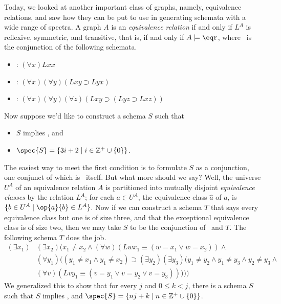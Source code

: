 Today, we looked at another important class of graphs, namely, equivalence relations, and saw how they can be put to use in generating schemata with a wide range of spectra. A graph $A$ is an \emph{equivalence relation} if and only if $L^A$ is reflexive, symmetric, and transitive, that is, if and only if $A\models\eqr$, where \eqr\ is the conjunction of the following schemata.
\begin{itemize}
\item
{}: $(\forall x)Lxx$
\item
\sym: $(\forall x)(\forall y)(Lxy\supset Lyx)$
\item
\trans: $(\forall x)(\forall y)(\forall z)(Lxy\supset(Lyz\supset Lxz))$
\end{itemize}
Now suppose we'd like to construct a schema $S$ such that
\begin{itemize}
\item
$S$ implies \eqr, and
\item
$\spec{S}=\{3i+2\mid i\in\mathbb{Z}^+\cup\{0\}\}$.
\end{itemize}
The easiest way to meet the first condition is to formulate $S$ as a conjunction, one conjunct of which is \eqr\ itself. But what more should we say? Well, the universe $U^A$ of an equivalence relation $A$ is partitioned into mutually disjoint \emph{equivalence classes} by the relation $L^A$; for each $a\in U^A$, the equivalence class $\hat{a}$ of $a$, is $\{b\in U^A\mid \op{a}{b}\in L^A\}$. Now if we can construct a schema $T$ that says every equivalence class but one is of size three, and that the exceptional equivalence class is of size two, then we may take $S$ to be the conjunction of \eqr\ and $T$. The following schema $T$ does the job.
\begin{align*} 
(\exists x_1)&(\exists x_2)(x_1\neq x_2\wedge (\forall w)(Lwx_1\equiv(w=x_1\vee w=x_2))\wedge\\
&(\forall y_1) ((y_1\neq x_1\wedge y_1\neq x_2)\supset(\exists y_2)(\exists y_3)(y_1\neq y_2\wedge y_1\neq y_3\wedge y_2\neq y_3\wedge\\
& (\forall v)(Lvy_1\equiv(v=y_1\vee v=y_2\vee v=y_3)))))
\end{align*}
We generalized this to show that for every $j$ and $0\leq k<j$, there is a schema $S$ such that $S$ implies \eqr, and $\spec{S}=\{nj+k\mid n\in \mathbb{Z}^+\cup\{0\}\}$. 
